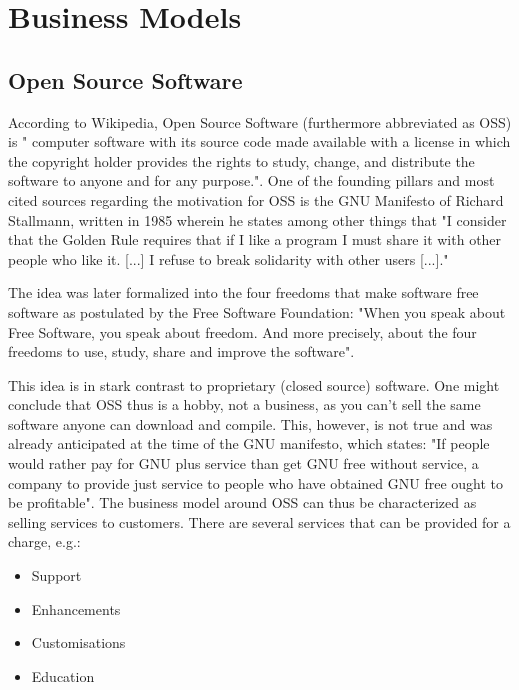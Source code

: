 \documentclass[a4paper]{report}
\begin{document}
\section{Business Models}
\label{sec:BusMods}

\subsection{Open Source Software}
\label{ssec:OSS}
According to Wikipedia, Open Source Software (furthermore abbreviated as OSS) is " computer software with its source code made available with a license in which the copyright holder provides the rights to study, change, and distribute the software to anyone and for any purpose."\parencite{WikiOSS}. One of the founding pillars and most cited sources regarding the motivation for OSS is the GNU Manifesto of Richard Stallmann, written in 1985 wherein he states among other things that "I consider that the Golden Rule requires that if I like a program I must share it with other people who like it. [...] I refuse to break solidarity with other users [...]."\parencite{GnuManifesto}

The idea was later formalized into the four freedoms that make software free software as postulated by the Free Software Foundation: "When you speak about Free Software, you speak about freedom. And more precisely, about the four freedoms to use, study, share and improve the software"\parencite{FourFreedoms}.

This idea is in stark contrast to proprietary (closed source) software. One might conclude that OSS thus is a hobby, not a business, as you can't sell the same software anyone can download and compile. This, however, is not true and was already anticipated at the time of the GNU manifesto, which states: "If people would rather pay for GNU plus service than get GNU free without service, a company to provide just service to people who have obtained GNU free ought to be profitable"\parencite{GnuManifesto}. The business model around OSS can thus be characterized as selling services to customers. There are several services that can be provided for a charge, e.g.:
\begin{itemize}
	\item Support
	\item Enhancements
	\item Customisations
	\item Education 
\end{itemize}
\end{document}
